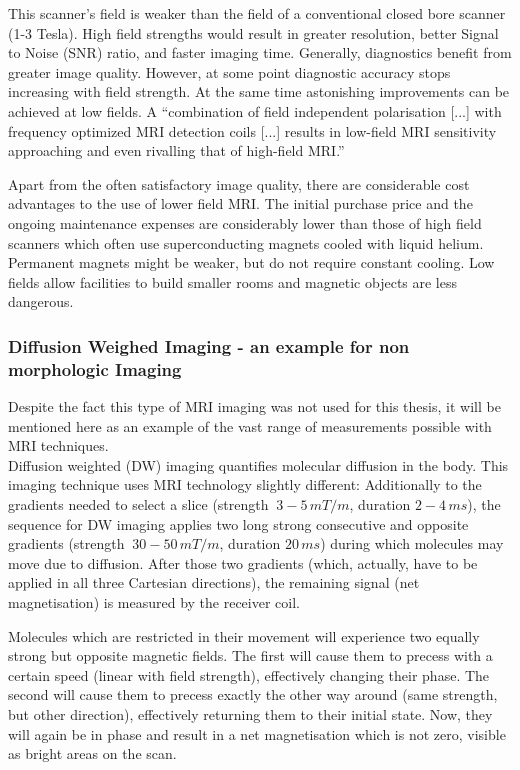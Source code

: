 This scanner's field is weaker than the field of a conventional closed bore scanner (1-3 Tesla).
High field strengths would result in greater resolution, better Signal to Noise (SNR) ratio, and faster imaging time.
Generally, diagnostics benefit from greater image quality.
However, at some point diagnostic accuracy stops increasing with field strength.
At the same time astonishing improvements can be achieved at low fields.
A ``combination of field independent polarisation [...] with frequency optimized MRI detection coils [...] results in low-field MRI sensitivity approaching and even rivalling that of high-field MRI.'' \cite{Coffey2013}

Apart from the often satisfactory image quality, there are considerable cost advantages to the use of lower field MRI.
The initial purchase price and the ongoing maintenance expenses are considerably lower than those of high field scanners which often use superconducting magnets cooled with liquid helium. \cite{Rutt1996}
Permanent magnets might be weaker, but do not require constant cooling.
Low fields allow facilities to build smaller rooms and magnetic objects are less dangerous.


\subsubsection{Diffusion Weighed Imaging - an example for non morphologic Imaging}

Despite the fact this type of MRI imaging was not used for this thesis, it will be mentioned here as an example of the vast range of measurements possible with MRI techniques.
\\
Diffusion weighted (DW) imaging quantifies molecular diffusion in the body.
This imaging technique uses MRI technology slightly different:
Additionally to the gradients needed to select a slice (strength $~3-5\, mT/m$, duration $2-4\, ms$), the sequence for DW imaging applies two long strong consecutive and opposite gradients (strength $~30-50\, mT/m$, duration $20\, ms$) during which molecules may move due to diffusion.
After those two gradients (which, actually, have to be applied in all three Cartesian directions), the remaining signal (net magnetisation) is measured by the receiver coil.

Molecules which are restricted in their movement will experience two equally strong but opposite magnetic fields.
The first will cause them to precess with a certain speed (linear with field strength), effectively changing their phase.
The second will cause them to precess exactly the other way around (same strength, but other direction), effectively returning them to their initial state.
Now, they will again be in phase and result in a net magnetisation which is not zero, visible as bright areas on the scan.

